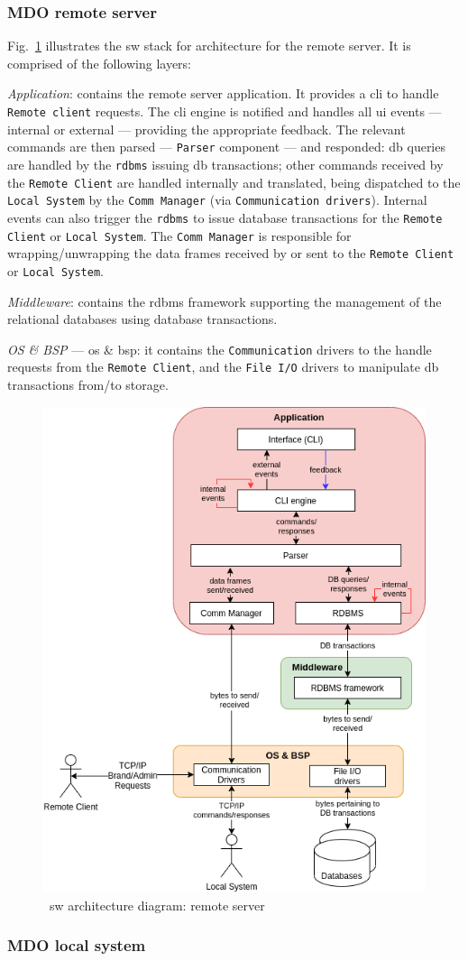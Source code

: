 \subsubsection{MDO remote server}
\label{sec:mdo-remote-server-1}
%
Fig.~\ref{fig:sw-arch-rs} illustrates the \gls{sw} stack for architecture for
the remote server.
It is comprised of the following layers:
\begin{item-c}
\item \emph{Application}: contains the remote server application. It provides a
  \gls{cli} to handle \texttt{Remote client} requests.  The \gls{cli} engine
  is notified and handles all \gls{ui} events --- internal or external ---
  providing the appropriate feedback. The relevant commands
  are then parsed --- \texttt{Parser} component --- and responded: \gls{db}
  queries are handled by the \texttt{\gls{rdbms}} issuing \gls{db} transactions;
  other commands received by the \texttt{Remote Client} are handled internally
  and translated, being dispatched to the \texttt{Local
    System} by the \texttt{Comm Manager}  (via \texttt{Communication drivers}). Internal events can also
  trigger the \texttt{\gls{rdbms}} to issue database transactions for the
  \texttt{Remote Client} or \texttt{Local System}.
  The \texttt{Comm Manager} is responsible for wrapping\slash unwrapping the data
  frames received by or sent to the \texttt{Remote Client} or \texttt{Local System}.
\item \emph{Middleware}: contains the \gls{rdbms} framework supporting the
  management of the relational databases using database transactions.
\item \emph{OS \& BSP} --- \gls{os} \& \gls{bsp}: it contains the \texttt{Communication}
  drivers to the handle requests from the \texttt{Remote Client}, and the
  \texttt{File I/O} drivers to manipulate \gls{db} transactions from\slash to storage.
\end{item-c}
%
\begin{figure}
\centering
    \includegraphics[width=0.55\columnwidth]{./img/sw-arch-rs.png}
  \caption{~\gls{sw} architecture diagram: remote server}%
\label{fig:sw-arch-rs}
\end{figure}
%
\subsubsection{MDO local system}
\label{sec:mdo-local-system-1}




